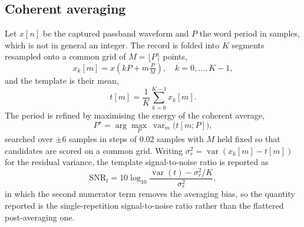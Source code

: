\documentclass[journal]{IEEEtran}   %
\begin{document}
\subsection{Coherent averaging}
Let $x[n]$ be the captured passband waveform and $P$ the word period in samples,
which is not in general an integer. The record is folded into $K$ segments
resampled onto a common grid of $M = \lfloor P \rceil$ points,
\begin{equation}
x_k[m] = x\!\left(kP + m\tfrac{P}{M}\right),
\quad k = 0,\dots,K-1,
\label{eq:fold}
\end{equation}
and the template is their mean,
\begin{equation}
t[m] = \frac{1}{K}\sum_{k=0}^{K-1} x_k[m].
\label{eq:template}
\end{equation}
The period is refined by maximising the energy of the coherent average,
\begin{equation}
P^{\star} = \arg\max_{P} \ \operatorname{var}_m\big(t[m; P]\big),
\label{eq:period}
\end{equation}
searched over $\pm 6$ samples in steps of $0.02$ samples with $M$ held fixed so
that candidates are scored on a common grid. Writing
$\sigma_r^2 = \operatorname{var}(x_k[m] - t[m])$ for the residual variance, the
template signal-to-noise ratio is reported as
\begin{equation}
\mathrm{SNR}_t = 10\log_{10}
\frac{\operatorname{var}(t) - \sigma_r^2/K}{\sigma_r^2},
\label{eq:tsnr}
\end{equation}
in which the second numerator term removes the averaging bias, so the quantity
reported is the single-repetition signal-to-noise ratio rather than the
flattered post-averaging one.
\end{document}
